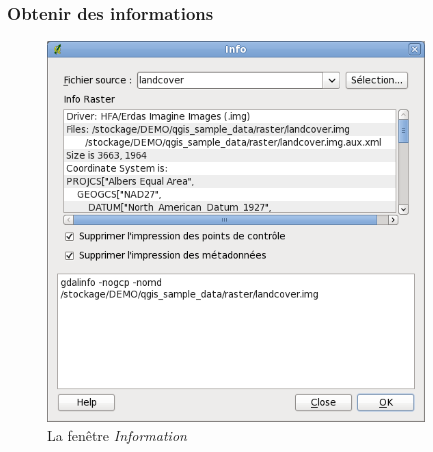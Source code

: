 {\subsubsection{Obtenir des informations}
\begin{figure}[ht]
   \centering
   \caption{La fenêtre \emph{Information} \nixcaption}\label{gdalinfo}
   \includegraphics[clip=true, width=10cm]{plugins_gdaltools_images/gdalinfo}
\end{figure}

}
